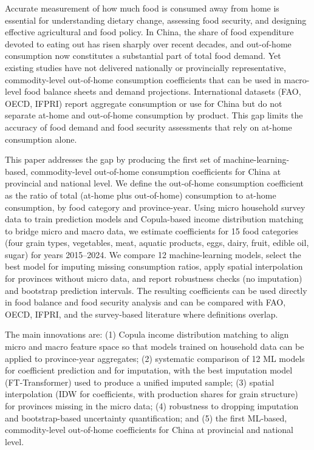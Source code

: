 \documentclass[12pt,a4paper]{article}
\begin{document}
Accurate measurement of how much food is consumed away from home is essential for understanding dietary change, assessing food security, and designing effective agricultural and food policy. In China, the share of food expenditure devoted to eating out has risen sharply over recent decades, and out-of-home consumption now constitutes a substantial part of total food demand. Yet existing studies have not delivered nationally or provincially representative, commodity-level out-of-home consumption coefficients that can be used in macro-level food balance sheets and demand projections. International datasets (FAO, OECD, IFPRI) report aggregate consumption or use for China but do not separate at-home and out-of-home consumption by product. This gap limits the accuracy of food demand and food security assessments that rely on at-home consumption alone.

This paper addresses the gap by producing the first set of machine-learning-based, commodity-level out-of-home consumption coefficients for China at provincial and national level. We define the out-of-home consumption coefficient as the ratio of total (at-home plus out-of-home) consumption to at-home consumption, by food category and province-year. Using micro household survey data to train prediction models and Copula-based income distribution matching to bridge micro and macro data, we estimate coefficients for 15 food categories (four grain types, vegetables, meat, aquatic products, eggs, dairy, fruit, edible oil, sugar) for years 2015--2024. We compare 12 machine-learning models, select the best model for imputing missing consumption ratios, apply spatial interpolation for provinces without micro data, and report robustness checks (no imputation) and bootstrap prediction intervals. The resulting coefficients can be used directly in food balance and food security analysis and can be compared with FAO, OECD, IFPRI, and the survey-based literature where definitions overlap.

The main innovations are: (1) Copula income distribution matching to align micro and macro feature space so that models trained on household data can be applied to province-year aggregates; (2) systematic comparison of 12 ML models for coefficient prediction and for imputation, with the best imputation model (FT-Transformer) used to produce a unified imputed sample; (3) spatial interpolation (IDW for coefficients, with production shares for grain structure) for provinces missing in the micro data; (4) robustness to dropping imputation and bootstrap-based uncertainty quantification; and (5) the first ML-based, commodity-level out-of-home coefficients for China at provincial and national level.
\end{document}
